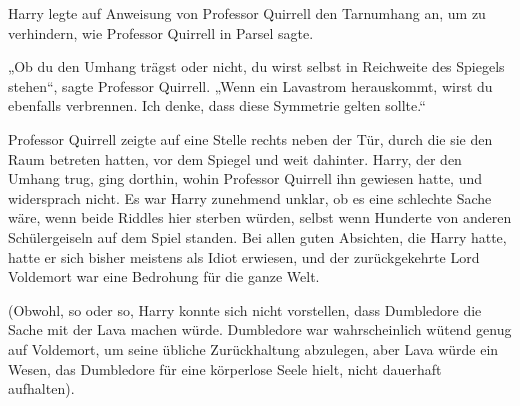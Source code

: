Harry legte auf Anweisung von Professor Quirrell den Tarnumhang an, um zu verhindern,  wie Professor Quirrell in Parsel sagte.

„Ob du den Umhang trägst oder nicht, du wirst selbst in Reichweite des Spiegels stehen“, sagte Professor Quirrell.
„Wenn ein Lavastrom herauskommt, wirst du ebenfalls verbrennen. Ich denke, dass diese Symmetrie gelten sollte.“

Professor Quirrell zeigte auf eine Stelle rechts neben der Tür, durch die sie den Raum betreten hatten, vor dem Spiegel und weit dahinter. Harry, der den Umhang trug, ging dorthin, wohin Professor Quirrell ihn gewiesen hatte, und widersprach nicht. Es war Harry zunehmend unklar, ob es eine schlechte Sache wäre, wenn beide Riddles hier sterben würden, selbst wenn Hunderte von anderen Schülergeiseln auf dem Spiel standen. Bei allen guten Absichten, die Harry hatte, hatte er sich bisher meistens als Idiot erwiesen, und der zurückgekehrte Lord Voldemort war eine Bedrohung für die ganze Welt.

(Obwohl, so oder so, Harry konnte sich nicht vorstellen, dass Dumbledore die Sache mit der Lava machen würde. Dumbledore war wahrscheinlich wütend genug auf Voldemort, um seine übliche Zurückhaltung abzulegen, aber Lava würde ein Wesen, das Dumbledore für eine körperlose Seele hielt, nicht dauerhaft aufhalten).


